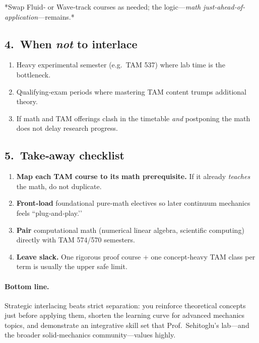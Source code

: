 \documentclass[12pt]{article}
\theoremstyle{definition} %
\theoremstyle{plain} %
\begin{document}
\noindent
*Swap Fluid‑ or Wave‑track courses as needed; the logic—\emph{math
just‐ahead‐of‐application}—remains.*

\subsection*{4.\  When \emph{not} to interlace}
\begin{enumerate}
  \item Heavy experimental semester (e.g.\ TAM 537) where lab time is
        the bottleneck.
  \item Qualifying‑exam periods where mastering TAM content trumps
        additional theory.
  \item If math and TAM offerings clash in the timetable \emph{and}
        postponing the math does not delay research progress.
\end{enumerate}

\subsection*{5.\  Take‑away checklist}
\begin{enumerate}
  \item \textbf{Map each TAM course to its math prerequisite.}
        If it already \emph{teaches} the math, do not duplicate.
  \item \textbf{Front‑load} foundational pure‑math electives so later
        continuum mechanics feels “plug‑and‑play.’’
  \item \textbf{Pair} computational math (numerical linear algebra,
        scientific computing) directly with TAM 574/570 semesters.
  \item \textbf{Leave slack.}  One rigorous proof course + one
        concept‑heavy TAM class per term is usually the upper safe limit.
\end{enumerate}

\paragraph{Bottom line.}
Strategic interlacing beats strict separation: you reinforce theoretical
concepts just before applying them, shorten the learning curve for
advanced mechanics topics, and demonstrate an integrative skill set that
Prof.\ Sehitoglu’s lab—and the broader solid‑mechanics community—values
highly.
\end{document}

